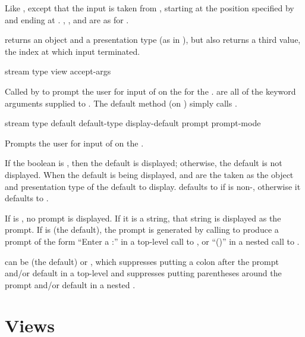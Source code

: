 Like , except that the input is taken from , starting at
the position specified by  and ending at .  ,
, and  are as for .

 returns an object and a presentation type (as in
), but also returns a third value, the index at which input
terminated.


 {stream type view \rest accept-args \key}

Called by  to prompt the user for input of 
 on the   for the  .
 are all of the keyword arguments supplied to .  The
default method (on ) simply calls
.

 {stream type
                              \key default default-type display-default
                                   prompt prompt-mode
                              \allow}

Prompts the user for input of   on the
 .

If the boolean  is , then the default is
displayed; otherwise, the default is not displayed.  When the default is being
displayed,  and  are the taken as the object and
presentation type of the default to display.  defaults to
 if  is non-, otherwise it defaults to
.

If  is , no prompt is displayed.  If it is a string, that
string is displayed as the prompt.  If  is  (the default), the
prompt is generated by calling  to produce a
prompt of the form ``Enter a :'' in a top-level call to ,
or ``()'' in a nested call to .

 can be  (the default) or , which
suppresses putting a colon after the prompt and/or default in a top-level
 and suppresses putting parentheses around the prompt and/or default
in a nested .


\section {Views}

